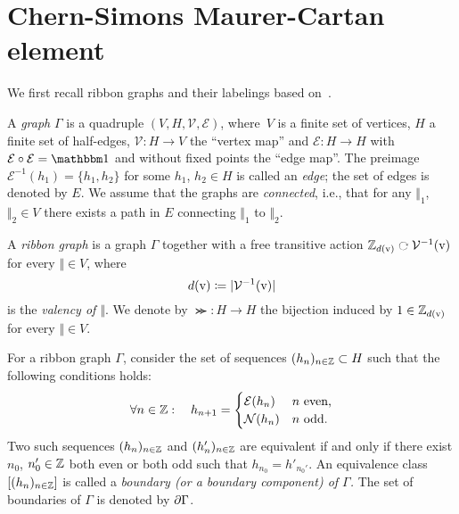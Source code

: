 \documentclass[\MainFolder/Text.tex]{subfiles}
\begin{document}
\section{Chern-Simons Maurer-Cartan element} \label{Section:Proof2} 

We first recall ribbon graphs and their labelings based on~\cite{Cieliebak2015}. 

\begin{Definition}\label{Def:Ribbon}
A \emph{graph} $\Gamma$ is a quadruple $(V,H,\mathcal{V},\mathcal{E})$, where~$V$ is a finite set of vertices, $H$ a finite set of half-edges, $\mathcal{V}: H \rightarrow V$ the ``vertex map'' and $\mathcal{E}: H \rightarrow H$ with $\mathcal{E} \circ \mathcal{E} = \Id$ and without fixed points the ``edge map''. The preimage $\mathcal{E}^{-1}(h_1) = \{h_1, h_2\}$ for some $h_1$, $h_2\in H$ is called an \emph{edge}; the set of edges is denoted by $E$. We assume that the graphs are \emph{connected}, i.e., that for any $\Vert_1$, $\Vert_2 \in V$ there exists a path in $E$ connecting $\Vert_1$ to $\Vert_2$.

A \emph{ribbon graph} is a graph $\Gamma$ together with a free transitive action $\Z_{d(\Vert)}\ \rotatebox[origin=c]{-90}{$\circlearrowright$}\  \mathcal{V}^{-1}(\Vert)$ for every $\Vert\in V$, where $$d(\mathrm{v}) \coloneqq |\mathcal{V}^{-1}(\mathrm{v})| $$
is the \emph{valency of $\Vert$}. We denote by $\Succ: H \rightarrow H$ the bijection induced by $1\in \mathbb{Z}_{d(\mathrm{v})}$ for every $\Vert\in V$.


For a ribbon graph $\Gamma$, consider the set of sequences $(h_n)_{n\in \mathbb{Z}} \subset H$ such that the following conditions holds:
$$ \forall n\in \mathbb{Z}: \quad  h_{n+1}= \begin{cases} 
\mathcal{E}(h_n) & n\text{ even,}\\                                
\mathcal{N}(h_n) & n\text{ odd.}
\end{cases}$$
Two such sequences $(h_n)_{n\in \mathbb{Z}}$ and $(h'_n)_{n\in \mathbb{Z}}$ are equivalent if and only if there exist $n_0$, $n'_0 \in \mathbb{Z}$ both even or both odd such that $h_{n_0} = h'_{n_0'}$. An equivalence class $[(h_n)_{n\in \mathbb{Z}}]$ is called a \emph{boundary (or a boundary component) of $\Gamma$.} The set of boundaries of $\Gamma$ is denoted by $\partial \Gamma$.


\end{Definition}
\end{document}
